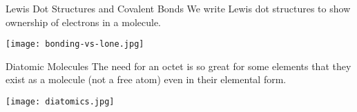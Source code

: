 \documentclass[handout]{beamer}
\begin{document}
\begin{frame}{Lewis Dot Structures and Covalent Bonds}
	We write Lewis dot structures to show ownership of electrons in a
	molecule.

	\bigskip

	\begin{center}
		\texttt{[image: bonding-vs-lone.jpg]}
	\end{center}

\end{frame}

\begin{frame}{Diatomic Molecules}
	The need for an octet is so great for some elements that they exist as a
	molecule (\alert{not} a free atom) even in their elemental form.

	\begin{center}
		\texttt{[image: diatomics.jpg]}
	\end{center}
\end{frame}

%
%	
%
\end{document}
